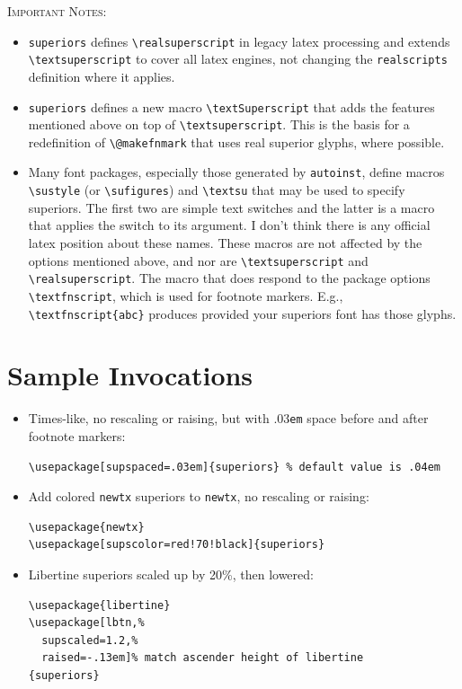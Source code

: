 \documentclass[11pt]{article}
\begin{document}
\textsc{Important Notes:}
\begin{itemize}
\item
{\tt superiors} defines \verb|\realsuperscript| in legacy latex processing and extends \verb|\textsuperscript| to cover all latex engines, not changing the {\tt realscripts} definition where it applies. 
\item 
{\tt superiors} defines a new macro \verb|\textSuperscript| that adds the features mentioned above on top of \verb|\textsuperscript|. This is the basis for a redefinition of \verb|\@makefnmark| that uses real superior glyphs, where possible.
\item
Many font packages, especially those generated by {\tt autoinst}, define macros \verb|\sustyle| (or \verb|\sufigures|) and \verb|\textsu| that may be used to specify superiors. The first two are simple text switches and the latter is a macro that applies the switch to its argument. I don't think there is any official latex position about these names. These macros are not affected by the options mentioned above, and nor are \verb|\textsuperscript| and \verb|\realsuperscript|. The macro that does respond to the package options \verb|\textfnscript|, which is used for footnote markers. E.g., \verb|\textfnscript{abc}| produces  provided your superiors font has those glyphs.

\end{itemize}

\section*{Sample Invocations}

\begin{itemize}
\item Times-like, no rescaling or raising, but with $.03${\tt em} space before and after footnote markers:
\begin{verbatim}
\usepackage[supspaced=.03em]{superiors} % default value is .04em
\end{verbatim}
\item Add colored {\tt newtx} superiors to {\tt newtx}, no rescaling or raising:
\begin{verbatim}
\usepackage{newtx}
\usepackage[supscolor=red!70!black]{superiors} \end{verbatim}
\item Libertine superiors scaled up by 20\%, then lowered:
\begin{verbatim}
\usepackage{libertine}
\usepackage[lbtn,%
  supscaled=1.2,%
  raised=-.13em]% match ascender height of libertine
{superiors}
\end{verbatim}
\end{itemize}
\end{document}
